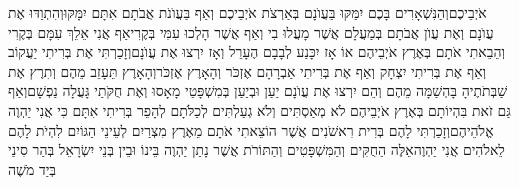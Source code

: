 \documentclass[../main/main.tex]{subfiles}
\begin{document}
\begin{multicols*}{\ncols}
אֹיְבֵיכֶם\PreVerseSpace{}וְהַנִּשְׁאָרִים בָּכֶם יִמַּקּוּ בַּעֲוֺנָם בְּאַרְצֹת אֹיְבֵיכֶם וְאַף בַּעֲוֺנֹת אֲבֹתָם אִתָּם יִמָּקּוּ\PreVerseSpace{}וְהִתְוַדּוּ אֶת עֲוֺנָם וְאֶת עֲוֺן אֲבֹתָם בְּמַעֲלָם אֲשֶׁר מָעֲלוּ בִי וְאַף אֲשֶׁר הָלְכוּ עִמִּי בְּקֶרִי\PreVerseSpace{}אַף אֲנִי אֵלֵךְ עִמָּם בְּקֶרִי וְהֵבֵאתִי אֹתָם בְּאֶרֶץ אֹיְבֵיהֶם אוֹ אָז יִכָּנַע לְבָבָם הֶעָרֵל וְאָז יִרְצוּ אֶת עֲוֺנָם\PreVerseSpace{}וְזָכַרְתִּי אֶת בְּרִיתִי יַעֲקוֹב וְאַף אֶת בְּרִיתִי יִצְחָק וְאַף אֶת בְּרִיתִי אַבְרָהָם אֶזְכֹּר וְהָאָרֶץ אֶזְכֹּר\PreVerseSpace{}וְהָאָרֶץ תֵּעָזֵב מֵהֶם וְתִרֶץ אֶת שַׁבְּתֹתֶיהָ בָּהְשַׁמָּה מֵהֶם וְהֵם יִרְצוּ אֶת עֲוֺנָם יַעַן וּבְיַעַן בְּמִשְׁפָּטַי מָאָסוּ וְאֶת חֻקֹּתַי גָּעֲלָה נַפְשָׁם\PreVerseSpace{}וְאַף גַּם זֹאת בִּהְיוֹתָם בְּאֶרֶץ אֹיְבֵיהֶם לֹא מְאַסְתִּים וְלֹא גְעַלְתִּים לְכַלֹּתָם לְהָפֵר בְּרִיתִי אִתָּם כִּי אֲנִי יַהְוֶה אֱלֹהֵיהֶם\PreVerseSpace{}וְזָכַרְתִּי לָהֶם בְּרִית רִאשֹׁנִים אֲשֶׁר הוֹצֵאתִי אֹתָם מֵאֶרֶץ מִצְרַיִם לְעֵינֵי הַגּוֹיִם לִהְיֹת לָהֶם לֵאלֹהִים אֲנִי יַהְוֶה\PreVerseSpace{}אֵלֶּה הַחֻקִּים וְהַמִּשְׁפָּטִים וְהַתּוֹרֹת אֲשֶׁר נָתַן יַהְוֶה בֵּינוֹ וּבֵין בְּנֵי יִשְׂרָאֵל בְּהַר סִינַי בְּיַד מֹשֶׁה\OpenSection{}\par

\end{multicols*}
\end{document}
